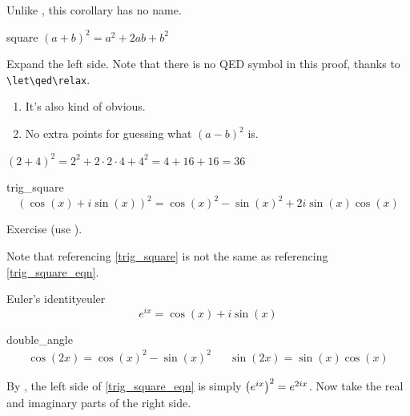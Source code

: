 \documentclass[10pt]{extarticle}
\makeatletter
\newcommand{\<}{\langle}
\renewcommand{\>}{\rangle}
\renewenvironment{proof}[1][\proofname] {\par\pushQED{\qed}{\normalfont\sffamily\bfseries\topsep6\p@\@plus6\p@\relax #1\@addpunct{.} }}{\popQED\endtrivlist\@endpefalse}
\theoremstyle{mystyle}{\newtheorem*{remark}{Remark}}
\theoremstyle{mystyle}{\newtheorem*{remarks}{Remarks}}
\theoremstyle{mystyle}{\newtheorem*{example}{Example}}
\theoremstyle{mystyle}{\newtheorem*{examples}{Examples}}
\theoremstyle{definition}{\newtheorem*{exercise}{Exercise}}
\theoremstyle{warn}
\makeatother
\begin{document}
\begin{corollary}{}{}
Unlike , this corollary has no name.
\end{corollary}

\begin{lemma}{}{square}
$(a+b)^2=a^2+2ab+b^2$
\end{lemma}
\begin{proof}\let\qed\relax
Expand the left side. Note that there is no QED symbol in this proof, thanks to \verb!\let\qed\relax!.
\end{proof}
\begin{remarks}\leavevmode %
\begin{enumerate}
    \item It's also kind of obvious.
    \item No extra points for guessing what $(a-b)^2$ is.
\end{enumerate}
\end{remarks}

\begin{example}
$(2+4)^2=2^2+2\cdot 2\cdot 4+4^2=4+16+16=36$
\end{example}

\begin{proposition}{}{trig_square}
\begin{equation}\label{trig_square_eqn}
    (\cos(x)+i\sin(x))^2=\cos(x)^2-\sin(x)^2+2i\sin(x)\cos(x)
\end{equation}
\end{proposition}
\begin{proof}
Exercise (use ).
\end{proof}

Note that referencing \cref{trig_square} is not the same as referencing \eqref{trig_square_eqn}.

\begin{lemma}{Euler's identity}{euler}
\begin{equation*}
    e^{ix}=\cos(x)+i\sin(x)
\end{equation*}
\end{lemma}

\begin{theorem}{}{double_angle}
\begin{align}
    \cos(2x)=\cos(x)^2-\sin(x)^2 && \sin(2x)=\sin(x)\cos(x)
\end{align}
\end{theorem}
\begin{proof}
By , the left side of \eqref{trig_square_eqn} is simply $\qty(e^{ix})^2=e^{2ix}$. Now take the real and imaginary parts of the right side.
\end{proof}
\end{document}
